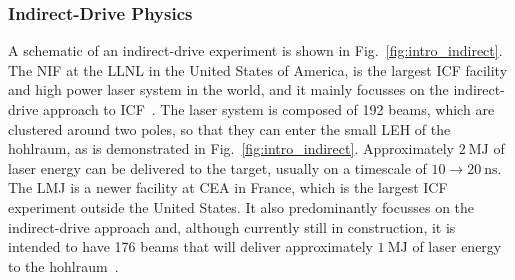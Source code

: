\subsubsection{Indirect-Drive Physics}%
\label{sec:intro_indirect_phys}

A schematic of an indirect-drive experiment is shown in Fig.~\ref{fig:intro_indirect}.
The \ac{NIF} at the \ac{LLNL} in the United States of America, is the largest \ac{ICF} facility and high power laser system in the world, and it mainly focusses on the indirect-drive approach to \ac{ICF}~\cite{miller_national_2004,spaeth_description_2016}.
The laser system is composed of 192 beams, which are clustered around two poles, so that they can enter the small \ac{LEH} of the hohlraum, as is demonstrated in Fig.~\ref{fig:intro_indirect}.
Approximately $2\ \text{MJ}$ of laser energy can be delivered to the target, usually on a timescale of $10\rightarrow20\ \text{ns}$.
The \ac{LMJ} is a newer facility at \ac{CEA} in France, which is the largest \ac{ICF} experiment outside the United States.
It also predominantly focusses on the indirect-drive approach and, although currently still in construction, it is intended to have 176 beams that will deliver approximately $1\ \text{MJ}$ of laser energy to the hohlraum~\cite{fleurot_laser_2005}.

